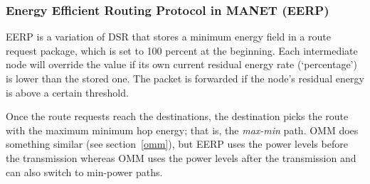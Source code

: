 \subsubsection{Energy Efficient Routing Protocol in MANET (EERP)}
EERP\cite{main2} is a variation of DSR that stores a minimum energy field
in a route request package, which is set to 100 percent at the beginning.
Each intermediate node will override the value if its own current residual energy rate (`percentage') is lower than the stored one.
The packet is forwarded if the node's residual energy is above a certain threshold.

Once the route requests reach the destinations, the destination picks the route
with the maximum minimum hop energy; that is, the \textit{max-min} path.
OMM\cite{li2001online} does something similar (see section~\ref{omm}), but EERP uses the power
levels before the transmission whereas OMM uses the power levels after the
transmission and can also switch to min-power paths.
